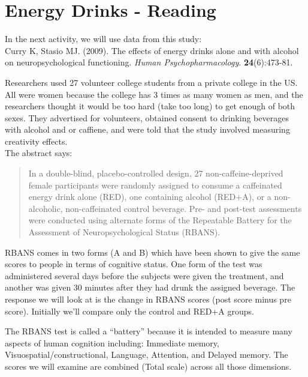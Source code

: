 \def\theTopic{Reading 12}

\section{Energy Drinks - Reading}

In the next activity, we will use data  from this study:\\

 Curry K, Stasio MJ.  (2009). The effects of energy drinks alone and with
 alcohol on neuropsychological functioning. {\it Human  Psychopharmacology}.
{\bf 24}(6):473-81. 

Researchers used 27 volunteer college students from a private college
in the US. All were women because the college has 3 times as many
women as men, and the researchers thought it would be too hard (take
too long)  to get enough of both sexes. They advertised for
volunteers, obtained consent to drinking beverages with alcohol and or
caffiene, and were told that the study involved measuring creativity
effects. \\
The abstract says:

\begin{quotation}
  In a double-blind, placebo-controlled design, 27
  non-caffeine-deprived female participants were randomly assigned to
  consume a caffeinated energy drink alone (RED), one containing
  alcohol (RED+A), or a non-alcoholic, non-caffeinated control
  beverage. Pre- and post-test assessments were conducted using
  alternate forms of the Repeatable Battery for the Assessment of
  Neuropsychological Status (RBANS).
\end{quotation}

RBANS comes in two forms (A and B) which have been shown to give the
same scores to people in terms of cognitive status.  One form of the
test was administered several days before the subjects were given the
treatment, and another was given 30 minutes after they had drunk the
assigned beverage.  The response we will look at is the change in
RBANS scores (post score minus pre score). Initially we'll compare
only the control and RED+A groups.

The RBANS test is called a ``battery'' because it is intended to measure
many aspects of human cognition including: Immediate memory,
Visuospatial/constructional, Language, Attention, and  Delayed
memory. The scores we will examine are combined (Total scale) across
all those dimensions.  

